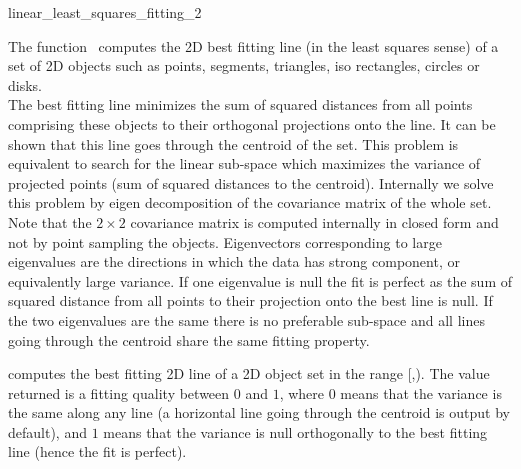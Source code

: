 
\begin{ccRefFunction}{linear_least_squares_fitting_2}  

\ccDefinition
  
The function \ccRefName\ computes the 2D best fitting line (in the least squares sense) of a set of 2D objects such as points, segments, triangles, iso rectangles, circles or disks.\\

The best fitting line minimizes the sum of squared distances from all points comprising these objects to their orthogonal projections onto the line. It can be shown that this line goes through the centroid of the set. This problem is equivalent to search for the linear sub-space which maximizes the variance of projected points (sum of squared distances to the centroid). Internally we solve this problem by eigen decomposition of the  covariance matrix of the whole set. Note that the $2 \times 2$ covariance matrix is computed internally in closed form and not by point sampling the objects. Eigenvectors corresponding to large eigenvalues are the directions in which the data has strong component, or equivalently large variance. If one eigenvalue is null the fit is perfect as the sum of squared distance from all points to their projection onto the best line is null. If the two eigenvalues are the same there is no preferable sub-space and all lines going through the centroid share the same fitting property. \\



{ computes the best fitting 2D line of a 2D object set in the range [,). The value returned is a fitting quality between $0$ and $1$, where $0$ means that the variance is the same along any line (a horizontal line going through the centroid is output by default), and $1$ means that the variance is null orthogonally to the best fitting line (hence the fit is perfect).
 }


\end{ccRefFunction}
